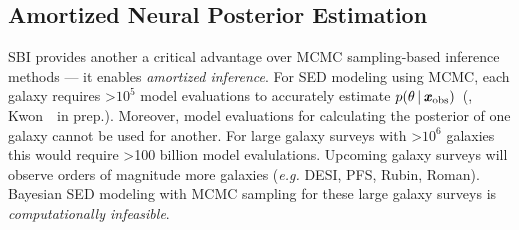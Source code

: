

\subsection{Amortized Neural Posterior Estimation} \label{sec:flow}
SBI provides another a critical advantage over MCMC sampling-based
inference methods --- it enables \emph{amortized inference}. 
For SED modeling using MCMC, each galaxy requires >$10^5$ model evaluations to
accurately estimate $p(\theta \,|\, \textbf{\textit{x}}_{\rm obs})$~(\citealt{hahn2022}, Kwon~\etal~in
prep.).
Moreover, model evaluations for calculating the posterior of one galaxy cannot
be used for another. 
For large galaxy surveys with >$10^6$
galaxies~\citep[\emph{e.g.} SDSS,][]{ahumada2020} this would require >100
billion model evalulations.
Upcoming galaxy surveys will observe orders of magnitude more galaxies
(\emph{e.g.} DESI, PFS, Rubin, Roman).
Bayesian SED modeling with MCMC sampling for these large galaxy surveys is
\emph{computationally infeasible}.



